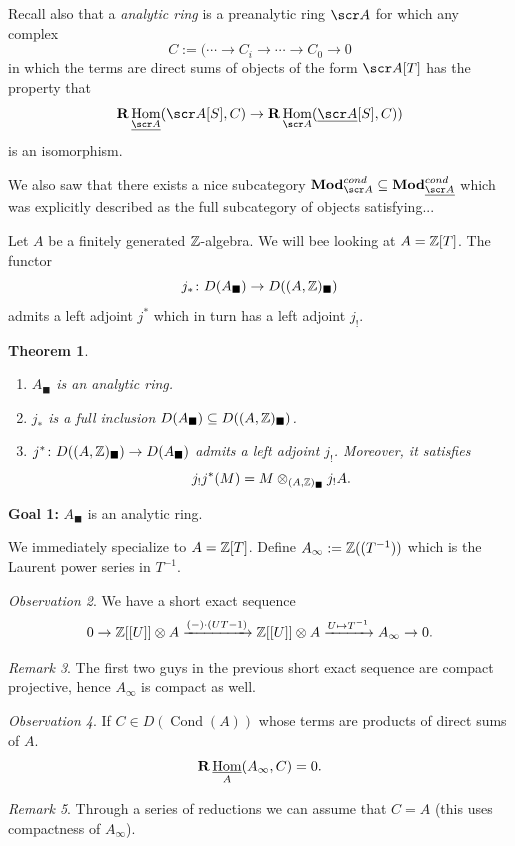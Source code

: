 \documentclass[A4paper, british]{amsart}
\theoremstyle{darkgreentheorem}
\newtheorem{thm}{Theorem}[section]
\theoremstyle{darkbluedefinition}
\theoremstyle{darkredexample}
\theoremstyle{remark}
\newtheorem{rem}[thm]{Remark}
\newtheorem{obs}[thm]{Observation}
\DeclareMathOperator{\Hom}{Hom}
\DeclareMathOperator{\Cond}{Cond}
\DeclareMathOperator{\ihom}{\underline{Hom}}
\newcommand{\1}{\mathbbm{1}}
\renewcommand{\u}[1]{\underline{#1}}
\newcommand{\ot}{\otimes}
\newcommand{\sub}{\subseteq}
\newcommand{\usolid}{_{\blacksquare}}
\begin{document}
Recall also that a \textit{analytic ring} is a preanalytic ring $\sA$ for which any complex
\[ C:= (\cdots \to C_{i}\to \cdots \to C_{0}\to 0 \]
in which the terms are direct sums of objects of the form $\sA[T]$ has the property that
\[ \bfR\Hom_{\u{\sA}}(\sA[S],C)\to \bfR\Hom_{\sA}(\u{\sA}[S],C)) \]
is an isomorphism.

We also saw that there exists a nice subcategory $\Mod_{\sA}^{cond}\sub \Mod_{\u{\sA}}^{cond}$ which was explicitly described as the full subcategory of objects satisfying...

Let $A$ be a finitely generated $\mathbb{Z}$-algebra.
We will bee looking at $A=\mathbb{Z}[T]$.
The functor
\[ j_{*}\colon D(A\usolid)\to D((A,\Z)\usolid) \]
admits a left adjoint $j^{*}$ which in turn has a left adjoint $j_{!}$.

\begin{thm}
    \begin{enumerate}
	\item $A\usolid$ is an analytic ring.
	\item $j_{*}$ is a full inclusion $D(A\usolid)\sub D((A,\Z)\usolid)$.
	\item $j^{*}\colon D((A,\Z)\usolid)\to D(A\usolid)$ admits a left adjoint $j_{!}$.
	    Moreover, it satisfies
	    \[ j_{!}j^{*}(M)=M\ot_{(A,\Z)\usolid}j_{!}A. \]
    \end{enumerate}
\end{thm}

\textbf{Goal 1:} $A\usolid$ is an analytic ring.

We immediately specialize to $A=\mathbb{Z}[T]$.
Define $A_{\infty}:=\mathbb{Z}((T^{-1}))$ which is the Laurent power series in $T^{-1}$.

\begin{obs}
    We have a short exact sequence
    \[ 0 \to \Z[[U]]\ot A\xrightarrow{(-)\cdot (UT-1)} \Z[[U]]\ot A\xrightarrow{U\mapsto T^{-1}}A_{\infty}\to 0. \]
\end{obs}

\begin{rem}
    The first two guys in the previous short exact sequence are compact projective, hence $A_{\infty}$ is compact as well.
\end{rem}

\begin{obs}
    If $C\in D(\Cond(A))$ whose terms are products of direct sums of $A$.
    \[ \bfR\ihom_{A}(A_{\infty},C)=0 .\]
\end{obs}

\begin{rem}
    Through a series of reductions we can assume that $C=A$ (this uses compactness of $A_{\infty}$).
\end{rem}
\end{document}
